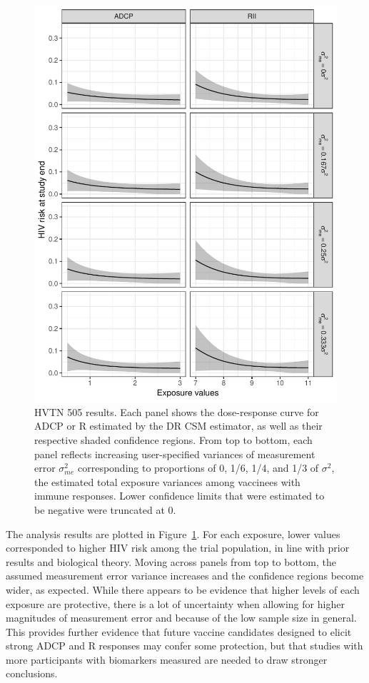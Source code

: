 \documentclass[useAMS,usenatbib,referee]{biom}
\newcommand{\RNum}[1]{\uppercase\expandafter{\romannumeral #1\relax}}
\begin{document}
\begin{figure}[h!]
\centering
\includegraphics[width=5.6in]{fig3-updated.pdf}
\caption{HVTN 505 results. Each panel shows the dose-response curve for ADCP or R\RNum{2} estimated by the DR CSM estimator, as well as their respective shaded confidence regions. From top to bottom, each panel reflects increasing user-specified variances of measurement error $\sigma^{2}_{me}$ corresponding to proportions of 0, 1/6, 1/4, and 1/3 of $\sigma^{2}$, the estimated total exposure variances among vaccinees with immune responses. Lower confidence limits that were estimated to be negative were truncated at 0.}
\label{fig:three}
\end{figure}

The analysis results are plotted in Figure~\ref{fig:three}. For each exposure, lower values corresponded to higher HIV risk among the trial population, in line with prior results and biological theory. Moving across panels from top to bottom, the assumed measurement error variance increases and the confidence regions become wider, as expected. While there appears to be evidence that higher levels of each exposure are protective, there is a lot of uncertainty when allowing for higher magnitudes of measurement error and because of the low sample size in general. This provides further evidence that future vaccine candidates designed to elicit strong ADCP and R\RNum{2} responses may confer some protection, but that studies with more participants with biomarkers measured are needed to draw stronger conclusions.
\end{document}
